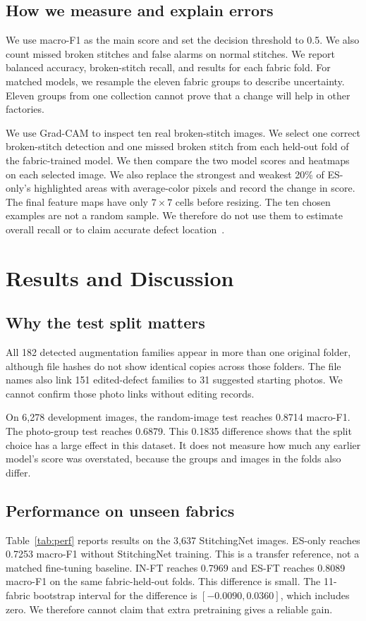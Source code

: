 \documentclass[conference,a4paper]{IEEEtran}
\begin{document}
\subsection{How we measure and explain errors}
We use macro-F1 as the main score and set the decision threshold to 0.5. We also count missed broken stitches and false alarms on normal stitches. We report balanced accuracy, broken-stitch recall, and results for each fabric fold. For matched models, we resample the eleven fabric groups to describe uncertainty. Eleven groups from one collection cannot prove that a change will help in other factories.

We use Grad-CAM to inspect ten real broken-stitch images. We select one correct broken-stitch detection and one missed broken stitch from each held-out fold of the fabric-trained model. We then compare the two model scores and heatmaps on each selected image. We also replace the strongest and weakest 20\% of ES-only's highlighted areas with average-color pixels and record the change in score. The final feature maps have only $7\times7$ cells before resizing. The ten chosen examples are not a random sample. We therefore do not use them to estimate overall recall or to claim accurate defect location~\cite{selvaraju2017,adebayo2018}.

\section{Results and Discussion}
\subsection{Why the test split matters}
All 182 detected augmentation families appear in more than one original folder, although file hashes do not show identical copies across those folders. The file names also link 151 edited-defect families to 31 suggested starting photos. We cannot confirm those photo links without editing records.

On 6,278 development images, the random-image test reaches 0.8714 macro-F1. The photo-group test reaches 0.6879. This 0.1835 difference shows that the split choice has a large effect in this dataset. It does not measure how much any earlier model's score was overstated, because the groups and images in the folds also differ.

\subsection{Performance on unseen fabrics}
Table~\ref{tab:perf} reports results on the 3,637 StitchingNet images. ES-only reaches 0.7253 macro-F1 without StitchingNet training. This is a transfer reference, not a matched fine-tuning baseline. IN-FT reaches 0.7969 and ES-FT reaches 0.8089 macro-F1 on the same fabric-held-out folds. This difference is small. The 11-fabric bootstrap interval for the difference is $[-0.0090,0.0360]$, which includes zero. We therefore cannot claim that extra pretraining gives a reliable gain.
\end{document}
